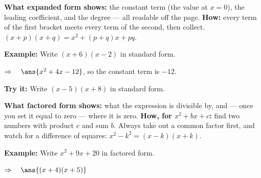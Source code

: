 \documentclass[12pt]{article}
\begin{document}


\begin{formulabox}
\textbf{What expanded form shows:} the constant term (the value at $x = 0$), the leading
coefficient, and the degree --- all readable off the page.
\textbf{How:} every term of the first bracket meets every term of the second, then collect.
$(x + p)(x + q) = x^2 + (p+q)x + pq$.
\end{formulabox}

\begin{examplebox}
\textbf{Example:} \quad Write $(x + 6)(x - 2)$ in standard form.

$\Rightarrow\quad \ans{x^2 + 4x - 12}$, so the constant term is $-12$.
\end{examplebox}

\begin{tryitbox}
\textbf{Try it:} \quad Write $(x - 5)(x + 8)$ in standard form.\\[2pt]
\end{tryitbox}


\begin{formulabox}
\textbf{What factored form shows:} what the expression is divisible by, and --- once you set it
equal to zero --- where it is zero.
\textbf{How, for $x^2 + bx + c$:} find two numbers with product $c$ and sum $b$. Always take out a
common factor first, and watch for a difference of squares: $x^2 - k^2 = (x-k)(x+k)$.
\end{formulabox}

\begin{examplebox}
\textbf{Example:} \quad Write $x^2 + 9x + 20$ in factored form.

$\Rightarrow\quad \ans{(x + 4)(x + 5)}$
\end{examplebox}
\end{document}
